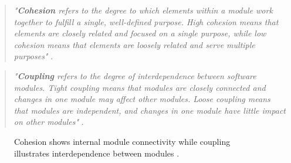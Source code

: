 \begin{quote}
\textit{"\textbf{Cohesion} refers to the degree to which elements within a module work together to fulfill a single, well-defined purpose. High cohesion means that elements are closely related and focused on a single purpose, while low cohesion means that elements are loosely related and serve multiple purposes"} \cite{geeksforgeeks:c&c}. \\
\end{quote}

\begin{quote}
\textit{"\textbf{Coupling} refers to the degree of interdependence between software modules. Tight coupling means that modules are closely connected and changes in one module may affect other modules. Loose coupling means that modules are independent, and changes in one module have little impact on other modules"} \cite{geeksforgeeks:c&c}. \\
\end{quote}

\begin{figure}[h!]
    \centering

    \caption[Cohesion and coupling]{Cohesion shows internal module connectivity while coupling illustrates interdependence between modules \cite{geeksforgeeks:c&c}.}
    \label{fig:cohesion-coupling}
\end{figure}

\newpage

